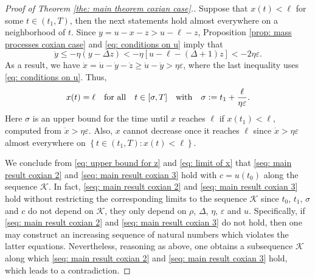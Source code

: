 \documentclass[a4paper, 12pt]{article}
\theoremstyle{definition}
\newcommand{\set}[2]{\left\{#1 : #2\right\}}
\newcommand{\defeq}{\vcentcolon=}
\newcommand{\calK}{\mathcal{K}}
\begin{document}
\begin{proof}[Proof of Theorem \ref{the: main theorem coxian case}.]
Suppose that $x(t) < \ell$ for some $t \in (t_1, T)$, then the next statements hold almost everywhere on a neighborhood of $t$. Since $y = u - x - z > u - \ell - z$, Proposition \ref{prop: mass processes coxian case} and \eqref{eq: conditions on u} imply that
\begin{equation*}
	\dot{y} \leq -\eta \left(y - \Delta z\right) < -\eta \left[u - \ell - (\Delta + 1)z\right] < -2\eta\varepsilon.
\end{equation*}
As a result, we have $\dot{x} = \dot{u} - \dot{y} - \dot{z} \geq \dot{u} - \dot{y} > \eta\varepsilon$, where the last inequality uses \eqref{eq: conditions on u}. Thus,
\begin{equation}
	\label{eq: limit of x}
	x(t) = \ell \quad \text{for all} \quad t \in [\sigma, T] \quad \text{with} \quad \sigma \defeq t_1 + \frac{\ell}{\eta\varepsilon}.
\end{equation}
Here $\sigma$ is an upper bound for the time until $x$ reaches $\ell$ if $x(t_1) < \ell$, computed from $\dot{x} > \eta\varepsilon$. Also, $x$ cannot decrease once it reaches $\ell$ since $\dot{x} > \eta\varepsilon$ almost everywhere on $\set{t \in (t_1, T)}{x(t) < \ell}$.

We conclude from \eqref{eq: upper bound for z} and \eqref{eq: limit of x} that \eqref{seq: main result coxian 2} and \eqref{seq: main result coxian 3} hold with $c = u(t_0)$ along the sequence $\calK$. In fact, \eqref{seq: main result coxian 2} and \eqref{seq: main result coxian 3} hold without restricting the corresponding limits to the sequence $\calK$ since $t_0$, $t_1$, $\sigma$ and $c$ do not depend on $\calK$, they only depend on $\rho$, $\Delta$, $\eta$, $\varepsilon$ and $u$. Specifically, if \eqref{seq: main result coxian 2} and \eqref{seq: main result coxian 3} do not hold, then one may construct an increasing sequence of natural numbers which violates the latter equations. Nevertheless, reasoning as above, one obtains a subsequence $\calK$ along which \eqref{seq: main result coxian 2} and \eqref{seq: main result coxian 3} hold, which leads to a contradiction.
%
\end{proof}

%
%
%
\end{document}
